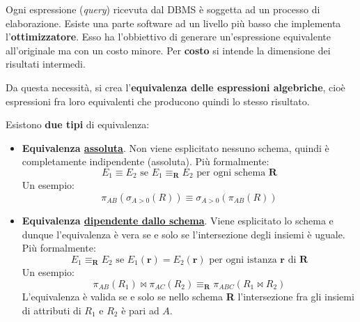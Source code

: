 \documentclass[a4paper]{article}
\begin{document}
	Ogni espressione (\emph{query}) ricevuta dal DBMS è soggetta ad un processo di elaborazione. Esiste una parte software ad un livello più basso che implementa l'\textcolor{Red3}{\textbf{ottimizzatore}}. Esso ha l'obbiettivo di generare un'espressione equivalente all'originale ma con un costo minore. Per \textbf{costo} si intende la dimensione dei risultati intermedi.\newline
	
	\noindent
	Da questa necessità, si crea l'\textcolor{Red3}{\textbf{equivalenza delle espressioni algebriche}}, cioè espressioni fra loro equivalenti che producono quindi lo stesso risultato.\newline
	
	\noindent
	Esistono \textbf{due tipi} di equivalenza:
	\begin{itemize}
		\item \textbf{Equivalenza \underline{assoluta}}. Non viene esplicitato nessuno schema, quindi è completamente indipendente (assoluta).\newline
		Più formalmente:
		\begin{equation*}
			E_{1} \equiv E_{2} \text{ se } E_{1} \equiv_{\textbf{R}} E_{2} \text{ per ogni schema } \textbf{R}
		\end{equation*}
		Un \textcolor{Green4}{esempio}:
		\begin{equation*}
			\pi_{AB}\left(\sigma_{A>0}\left(R\right)\right) \equiv \sigma_{A>0}\left(\pi_{AB}\left(R\right)\right)
		\end{equation*}
		
		\item \textbf{Equivalenza \underline{dipendente dallo schema}}. Viene esplicitato lo schema e dunque l'equivalenza è vera se e solo se l'intersezione degli insiemi è uguale.\newline
		Più formalmente:
		\begin{equation*}
			E_{1} \equiv_{\textbf{R}} E_{2} \text{ se } E_{1}\left(\textbf{r}\right) = E_{2}\left(\textbf{r}\right) \text{ per ogni istanza } \textbf{r} \text{ di } \textbf{R}
		\end{equation*}
		Un \textcolor{Green4}{esempio}:
		\begin{equation*}
			\pi_{AB}\left(R_{1}\right) \Join \pi_{AC}\left(R_{2}\right) \equiv_{\textbf{R}} \pi_{ABC}\left(R_{1} \Join R_{2}\right)
		\end{equation*}
		L'equivalenza è valida se e solo se nello schema \textbf{R} l'intersezione fra gli insiemi di attributi di $R_{1}$ e $R_{2}$ è pari ad $A$.
	\end{itemize}\newpage
	
\end{document}
